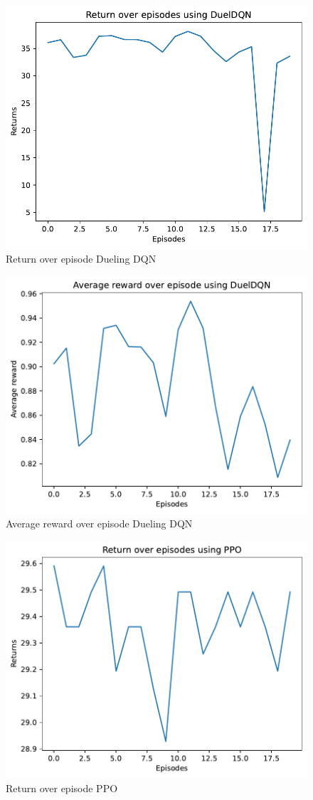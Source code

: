 \documentclass{article}
\begin{document}
\begin{figure}
    \centering
    \includegraphics[width=0.7\linewidth]{img/Return_over_episode_DuelDQN_4000.pdf}
    \caption{Return over episode Dueling DQN}
    \label{fig:Return_episode_Duel_DQN}
\end{figure}

\begin{figure}
    \centering
    \includegraphics[width=0.7\linewidth]{img/Average_reward_over_episode_DuelDQN_4000.pdf}
    \caption{Average reward over episode Dueling DQN}
    \label{fig:Reward_episode_Duel_DQN}
\end{figure}

\begin{figure}
    \centering
    \includegraphics[width=0.7\linewidth]{img/Return_over_episode_PPO_4000.pdf}
    \caption{Return over episode PPO}
    \label{fig:Return_episode_PPO}
\end{figure}
\end{document}
